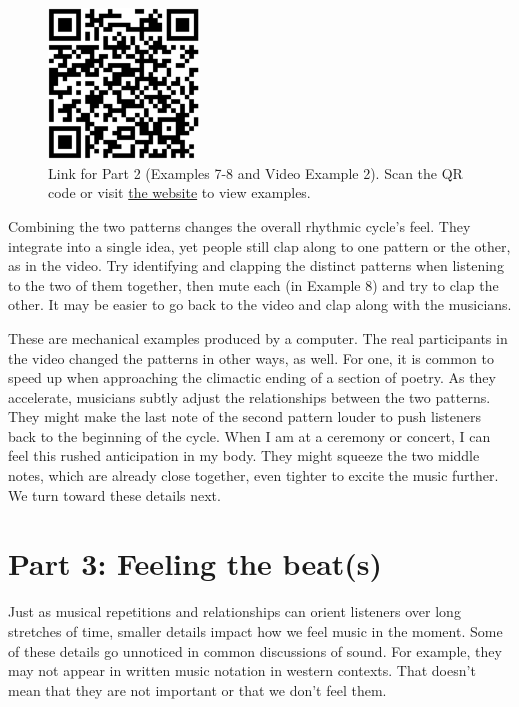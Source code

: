 \documentclass[twoside]{article}
\providecommand{\wmturlcaption}{
  Scan the QR code or visit \href{https://worldmusictextbook.org/witulski-2021}{the website} to view examples.
}
\begin{document}
\begin{figure}
  \centering
  \includegraphics[height=4cm]{witulski-rhythm-part-2.png}
  \caption*{Link for Part 2 (Examples 7-8 and Video Example 2). \wmturlcaption}
\end{figure}

Combining the two patterns changes the overall rhythmic cycle's feel.
They integrate into a single idea, yet people still clap along to one
pattern or the other, as in the video. Try identifying and clapping the
distinct patterns when listening to the two of them together, then mute
each (in Example 8) and try to clap the other. It may be easier to go back to the video
and clap along with the musicians.

These are mechanical examples produced by a computer. The real
participants in the video changed the patterns in other ways, as well.
For one, it is common to speed up when approaching the climactic ending
of a section of poetry. As they accelerate, musicians subtly adjust the
relationships between the two patterns. They might make the last note of
the second pattern louder to push listeners back to the beginning of the
cycle. When I am at a ceremony or concert, I can feel this rushed
anticipation in my body. They might squeeze the two middle notes, which
are already close together, even tighter to excite the music further. We
turn toward these details next.

\hypertarget{part-3-feeling-the-beats}{%
\section*{Part 3: Feeling the
beat(s)}\label{part-3-feeling-the-beats}}

Just as musical repetitions and relationships can orient listeners over
long stretches of time, smaller details impact how we feel music in the
moment. Some of these details go unnoticed in common discussions of
sound. For example, they may not appear in written music notation in
western contexts. That doesn't mean that they are not important or that
we don't feel them.
\end{document}
